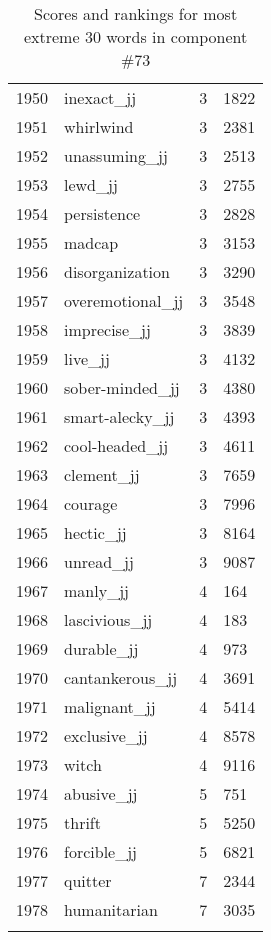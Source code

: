 \begin{longtable}[!htbp]{| rlr@{.}l |}
    1950 & inexact\_jj & 3 & 1822 \\
    1951 & whirlwind & 3 & 2381 \\
    1952 & unassuming\_jj & 3 & 2513 \\
    1953 & lewd\_jj & 3 & 2755 \\
    1954 & persistence & 3 & 2828 \\
    1955 & madcap & 3 & 3153 \\
    1956 & disorganization & 3 & 3290 \\
    1957 & overemotional\_jj & 3 & 3548 \\
    1958 & imprecise\_jj & 3 & 3839 \\
    1959 & live\_jj & 3 & 4132 \\
    1960 & sober-minded\_jj & 3 & 4380 \\
    1961 & smart-alecky\_jj & 3 & 4393 \\
    1962 & cool-headed\_jj & 3 & 4611 \\
    1963 & clement\_jj & 3 & 7659 \\
    1964 & courage & 3 & 7996 \\
    1965 & hectic\_jj & 3 & 8164 \\
    1966 & unread\_jj & 3 & 9087 \\
    1967 & manly\_jj & 4 & 164 \\
    1968 & lascivious\_jj & 4 & 183 \\
    1969 & durable\_jj & 4 & 973 \\
    1970 & cantankerous\_jj & 4 & 3691 \\
    1971 & malignant\_jj & 4 & 5414 \\
    1972 & exclusive\_jj & 4 & 8578 \\
    1973 & witch & 4 & 9116 \\
    1974 & abusive\_jj & 5 & 751 \\
    1975 & thrift & 5 & 5250 \\
    1976 & forcible\_jj & 5 & 6821 \\
    1977 & quitter & 7 & 2344 \\
    1978 & humanitarian & 7 & 3035 \\
    \hline
    \caption{Scores and rankings for most extreme 30 words in component \#73} \\
\end{longtable}
